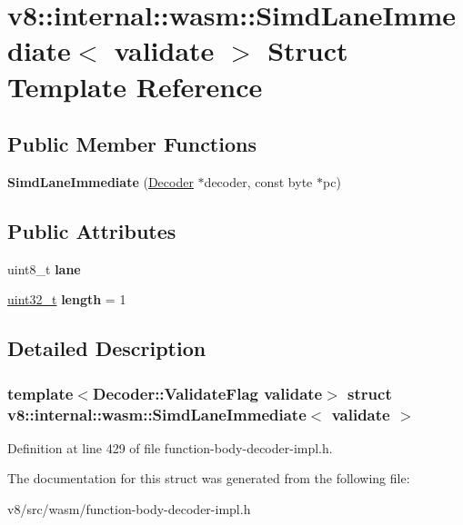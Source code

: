 \hypertarget{structv8_1_1internal_1_1wasm_1_1SimdLaneImmediate}{}\section{v8\+:\+:internal\+:\+:wasm\+:\+:Simd\+Lane\+Immediate$<$ validate $>$ Struct Template Reference}
\label{structv8_1_1internal_1_1wasm_1_1SimdLaneImmediate}
\subsection*{Public Member Functions}
\begin{DoxyCompactItemize}
\item 
\mbox{\label{structv8_1_1internal_1_1wasm_1_1SimdLaneImmediate_ae15d2ffa070785ea9d9d95cdc3911294}} 
{\bfseries Simd\+Lane\+Immediate} (\mbox{\hyperlink{classv8_1_1internal_1_1wasm_1_1Decoder}{Decoder}} $\ast$decoder, const byte $\ast$pc)
\end{DoxyCompactItemize}
\subsection*{Public Attributes}
\begin{DoxyCompactItemize}
\item 
\mbox{\label{structv8_1_1internal_1_1wasm_1_1SimdLaneImmediate_ad284e1f5e9e725a9b331a6bf255f8107}} 
uint8\+\_\+t {\bfseries lane}
\item 
\mbox{\label{structv8_1_1internal_1_1wasm_1_1SimdLaneImmediate_a738a2dabfe49ac20d8a3a0837d5b013b}} 
\mbox{\hyperlink{classuint32__t}{uint32\+\_\+t}} {\bfseries length} = 1
\end{DoxyCompactItemize}


\subsection{Detailed Description}
\subsubsection*{template$<$Decoder\+::\+Validate\+Flag validate$>$\newline
struct v8\+::internal\+::wasm\+::\+Simd\+Lane\+Immediate$<$ validate $>$}



Definition at line 429 of file function-\/body-\/decoder-\/impl.\+h.



The documentation for this struct was generated from the following file\+:\begin{DoxyCompactItemize}
\item 
v8/src/wasm/function-\/body-\/decoder-\/impl.\+h\end{DoxyCompactItemize}
